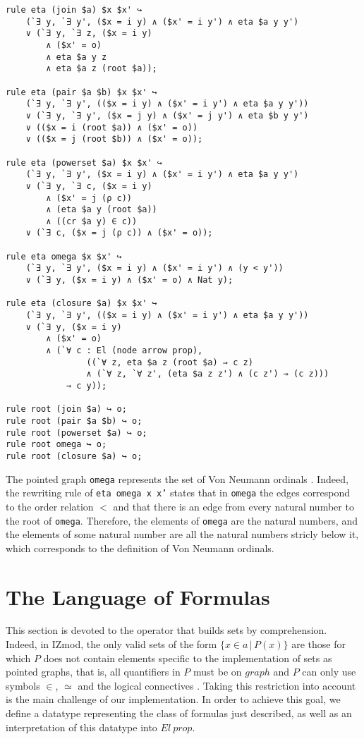 \documentclass[submission,copyright,creativecommons]{eptcs}
\begin{document}
\begin{lstlisting}
rule eta (join $a) $x $x' ↪ 
	(`∃ y, `∃ y', ($x = i y) ∧ ($x' = i y') ∧ eta $a y y')
    ∨ (`∃ y, `∃ z, ($x = i y) 
    	∧ ($x' = o) 
    	∧ eta $a y z 
    	∧ eta $a z (root $a));

rule eta (pair $a $b) $x $x' ↪ 
	(`∃ y, `∃ y', (($x = i y) ∧ ($x' = i y') ∧ eta $a y y'))
    ∨ (`∃ y, `∃ y', ($x = j y) ∧ ($x' = j y') ∧ eta $b y y')
    ∨ (($x = i (root $a)) ∧ ($x' = o))
    ∨ (($x = j (root $b)) ∧ ($x' = o));

rule eta (powerset $a) $x $x' ↪ 
	(`∃ y, `∃ y', ($x = i y) ∧ ($x' = i y') ∧ eta $a y y')
    ∨ (`∃ y, `∃ c, ($x = i y) 
    	∧ ($x' = j (ρ c)) 
    	∧ (eta $a y (root $a)) 
    	∧ ((cr $a y) ∈ c))
    ∨ (`∃ c, ($x = j (ρ c)) ∧ ($x' = o));

rule eta omega $x $x' ↪ 
	(`∃ y, `∃ y', ($x = i y) ∧ ($x' = i y') ∧ (y < y'))
    ∨ (`∃ y, ($x = i y) ∧ ($x' = o) ∧ Nat y);

rule eta (closure $a) $x $x' ↪ 
	(`∃ y, `∃ y', (($x = i y) ∧ ($x' = i y') ∧ eta $a y y'))
	∨ (`∃ y, ($x = i y) 
        ∧ ($x' = o)
        ∧ (`∀ c : El (node arrow prop), 
                ((`∀ z, eta $a z (root $a) ⇒ c z)
                ∧ (`∀ z, `∀ z', (eta $a z z') ∧ (c z') ⇒ (c z)))
            ⇒ c y));
            
rule root (join $a) ↪ o;
rule root (pair $a $b) ↪ o;
rule root (powerset $a) ↪ o;
rule root omega ↪ o;
rule root (closure $a) ↪ o;
\end{lstlisting}

The pointed graph \texttt{omega} represents the set of Von Neumann ordinals \cite[see Table 2]{zermodulo}. Indeed, the rewriting rule of \texttt{eta omega x x'} states that in \texttt{omega} the edges correspond to the order relation $<$ and that there is an edge from every natural number to the root of \texttt{omega}. Therefore, the elements of \texttt{omega} are the natural numbers, and the elements of some natural number are all the natural numbers stricly below it, which corresponds to the definition of Von Neumann ordinals.


\section{The Language of Formulas}

This section is devoted to the operator that builds sets by comprehension. Indeed, in IZmod, the only valid sets of the form $\{x\in a\,|\,P(x)\}$ are those for which $P$ does not contain elements specific to the implementation of sets as pointed graphs, that is, all quantifiers in $P$ must be on $graph$ and $P$ can only use symbols $\in$, $\simeq$ and the logical connectives \cite[see Table 5]{zermodulo}. Taking this restriction into account is the main challenge of our implementation. In order to achieve this goal, we define a datatype representing the class of formulas just described, as well as an interpretation of this datatype into $El~prop$.
\end{document}

